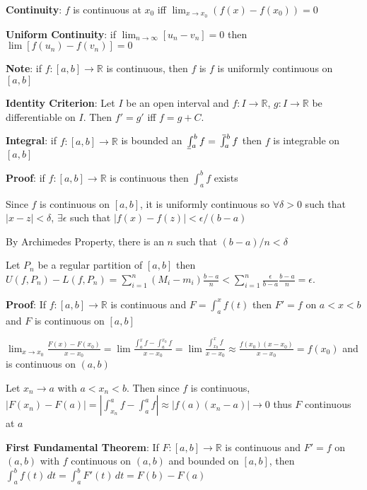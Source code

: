 \documentclass{article}
\def\upint{\mathchoice%
    {\mkern13mu\overline{\vphantom{\intop}\mkern7mu}\mkern-20mu}%
    {\mkern7mu\overline{\vphantom{\intop}\mkern7mu}\mkern-14mu}%
    {\mkern7mu\overline{\vphantom{\intop}\mkern7mu}\mkern-14mu}%
    {\mkern7mu\overline{\vphantom{\intop}\mkern7mu}\mkern-14mu}%
  \int}
\def\lowint{\mkern3mu\underline{\vphantom{\intop}\mkern7mu}\mkern-10mu\int}
\begin{document}
 

\textbf{Continuity}: $f$ is continuous at $x_0$ iff $\lim_{x \rightarrow x_0}(f(x) - f(x_0)) = 0$ \medskip

\textbf{Uniform Continuity}: if $\lim_{n \rightarrow \infty}[u_n - v_n] = 0$ then $\lim[f(u_n) - f(v_n)] = 0$ \medskip

\textbf{Note}: if $f \colon [a,b] \rightarrow \mathbb{R}$ is continuous, then $f$ is $f$ is uniformly continuous on $[a,b]$ \medskip

\textbf{Identity Criterion}: Let $I$ be an open interval and $f \colon I \rightarrow \mathbb{R}$, $g \colon I \rightarrow \mathbb{R}$ be differentiable on $I$. Then $f'=g'$ iff $f = g + C$. \medskip

\textbf{Integral}: if $f \colon [a,b] \rightarrow \mathbb{R}$ is bounded an $\lowint_a^b f = \upint_a^bf$ then $f$ is integrable on $[a,b]$ \medskip

\textbf{Proof}: if $f \colon [a,b] \rightarrow \mathbb{R}$ is continuous then $\int_a^b f$ exists

Since $f$ is continuous on $[a,b]$, it is uniformly continuous so $\forall \delta >0$ such that $|x - z| < \delta$, $\exists \epsilon$ such that $|f(x) - f(z)| < \epsilon/(b-a)$

By Archimedes Property, there is an $n$ such that $(b-a)/n < \delta$

Let $P_n$ be a regular partition of $[a,b]$ then $U(f,P_n) - L(f,P_n) = \sum_{i= 1}^n(M_i - m_i)\frac{b-a}{n} < \sum_{i=1}^n\frac{\epsilon}{b - a} \frac{b-a}{n} = \epsilon$. \medskip

\textbf{Proof}: If $f \colon [a,b] \rightarrow \mathbb{R}$ is continuous and $F = \int_a^x f(t)$ then $F' = f$ on $a < x < b$ and $F$ is continuous on $[a,b]$

$\lim_{x \rightarrow x_0}\frac{F(x) - F(x_0)}{x - x_0} = \lim \frac{\int_a^x f - \int_a^{x_0}f}{x - x_0} = \lim \frac{\int_{x_0}^x f}{x - x_0} \approx \frac{f(x_0)(x-x_0)}{x-x_0} = f(x_0)$ and is continuous on $(a,b)$

Let $x_n \rightarrow a$ with $a < x_n < b$. Then since $f$ is continuous, $|F(x_n) - F(a)| = |\int_{x_n}^a f - \int_a^a f| \approx|f(a)(x_n - a)| \rightarrow 0$ thus $F$ continuous at $a$ \medskip

\textbf{First Fundamental Theorem}: If $F \colon [a,b] \rightarrow \mathbb{R}$ is continuous and $F' = f$ on $(a,b)$ with $f$ continuous on $(a,b)$ and bounded on $[a,b]$, then $\int_a^b f(t) \, dt = \int_a^b F'(t) \, dt = F(b) - F(a)$
\end{document}
